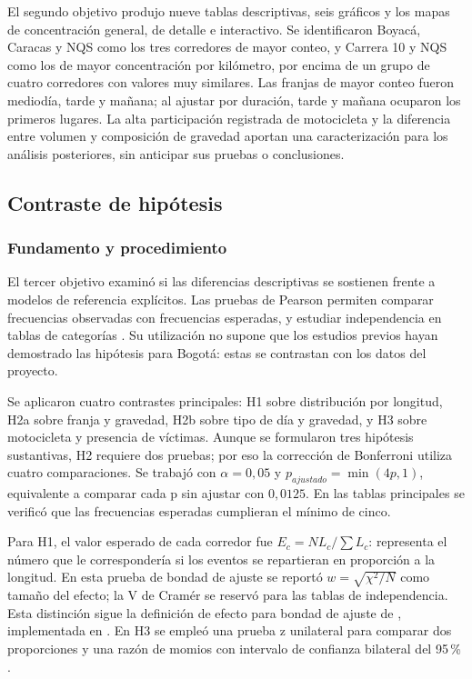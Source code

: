 \documentclass[12pt,letterpaper]{article}
\begin{document}
El segundo objetivo produjo nueve tablas descriptivas, seis gráficos y
los mapas de concentración general, de detalle e interactivo. Se identificaron
Boyacá, Caracas y NQS como los tres corredores de mayor conteo, y
Carrera 10 y NQS como los de mayor concentración por kilómetro, por encima de un grupo de cuatro corredores con valores muy similares.
Las franjas de mayor conteo fueron mediodía, tarde y mañana; al ajustar
por duración, tarde y mañana ocuparon los primeros lugares. La alta
participación registrada de motocicleta y la diferencia entre volumen
y composición de gravedad aportan una caracterización para los análisis
posteriores, sin anticipar sus pruebas o conclusiones.


\subsection{Contraste de hipótesis}

\subsubsection{Fundamento y procedimiento}

El tercer objetivo examinó si las diferencias descriptivas se sostienen
frente a modelos de referencia explícitos. Las pruebas de Pearson
permiten comparar frecuencias observadas con frecuencias esperadas,
y estudiar independencia en tablas de categorías \citep{scipy}.
Su utilización no supone que los estudios previos hayan demostrado las
hipótesis para Bogotá: estas se contrastan con los datos del proyecto.

Se aplicaron cuatro contrastes principales: H1 sobre distribución por
longitud, H2a sobre franja y gravedad, H2b sobre tipo de día y gravedad,
y H3 sobre motocicleta y presencia de víctimas. Aunque se formularon
tres hipótesis sustantivas, H2 requiere dos pruebas; por eso la corrección
de Bonferroni utiliza cuatro comparaciones. Se trabajó con
$\alpha=0{,}05$ y $p_{ajustado}=\min(4p,1)$, equivalente a comparar
cada p sin ajustar con $0{,}0125$. En las tablas principales se verificó
que las frecuencias esperadas cumplieran el mínimo de cinco.

Para H1, el valor esperado de cada corredor fue
$E_c=N L_c/\sum L_c$: representa el número que le correspondería si
los eventos se repartieran en proporción a la longitud. En esta prueba
de bondad de ajuste se reportó $w=\sqrt{\chi^2/N}$ como tamaño del
efecto; la V de Cramér se reservó para las tablas de independencia.
Esta distinción sigue la definición de efecto para bondad de ajuste de
\citet{cohen1988}, implementada en \citet{statsmodels}. En H3 se empleó una prueba z unilateral para
comparar dos proporciones y una razón de momios con intervalo de
confianza bilateral del 95\,\% \citep{statsmodels}.
\end{document}
